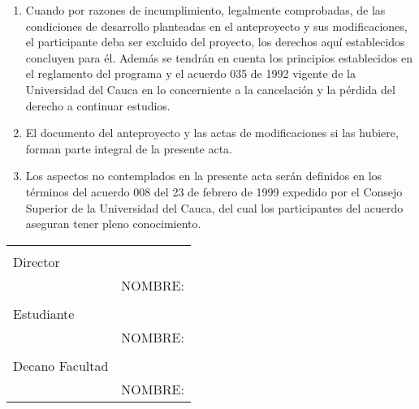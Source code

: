 \begin{enumerate}[topsep=0pt, leftmargin=0.6cm, label=\arabic*.-]
    \item Cuando por razones de incumplimiento, legalmente comprobadas, de las condiciones de desarrollo planteadas en el anteproyecto y sus modificaciones, el participante deba ser excluido del proyecto, los derechos aquí establecidos concluyen para él.  Además se tendrán en cuenta los principios establecidos en el reglamento del programa y el acuerdo 035 de 1992 vigente de la Universidad del Cauca en lo concerniente a la cancelación y la pérdida del derecho a continuar estudios.
    
    \item El documento del anteproyecto y las actas de modificaciones si las hubiere, forman parte integral de la presente acta.
    
    \item Los aspectos no contemplados en la presente acta serán definidos en los términos del acuerdo 008 del 23 de febrero de 1999 expedido por el Consejo Superior de la Universidad del Cauca, del cual los participantes del acuerdo aseguran tener pleno conocimiento.

\end{enumerate}

\begin{table}[!h]
    \centering
    \begin{tabular}{m{} m{}}
        
        & \\
        
        Director & \\
        \cline{2-2}
        & NOMBRE: \\
        
        & \\
        
        Estudiante & \\
        \cline{2-2}
        & NOMBRE: \\
        
        & \\
        
        Decano Facultad & \\
        \cline{2-2}
        & NOMBRE: \\

    \end{tabular}
\end{table}